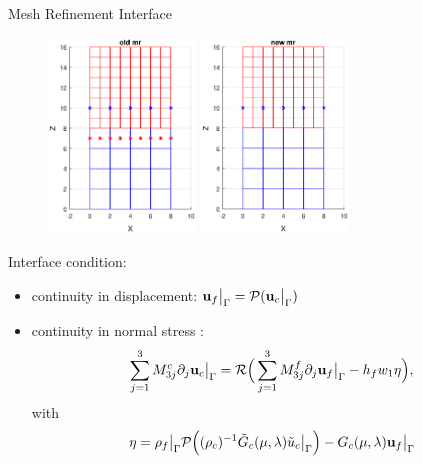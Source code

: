 \documentclass{beamer}
\begin{document}
\begin{frame}{Mesh Refinement Interface}
\begin{figure}[h]
\begin{center}
\includegraphics[width=0.35\textwidth]{mrold.eps}
\includegraphics[width=0.35\textwidth]{mrnew.eps}
\end{center}
\end{figure} 
Interface condition:
\begin{itemize}
    \item continuity in displacement: ${\bf u}_f\big|_{\Gamma} = \mathcal{P}({\bf u}_c\big|_{\Gamma})$
    \item continuity in normal stress : 
    \[\sum_{j=1}^3 M_{3j}^c\partial_j {\bf u}_c \big|_{\Gamma} = \mathcal{R}\Big(\sum_{j=1}^3 M_{3j}^f \partial_j {\bf u}_f\big|_{\Gamma}-h_fw_1{\bf \eta}\Big),\]
    with 
    \[{\bf \eta} = \rho_f\big|_{\Gamma}\mathcal{P}\Big((\rho_c)^{-1}\tilde{G}_c(\mu,\lambda)\tilde{u}_c\big|_{\Gamma}\Big)-G_c(\mu,\lambda){\bf u}_f\big|_{\Gamma}\]
\end{itemize}
\end{frame}
\end{document}
